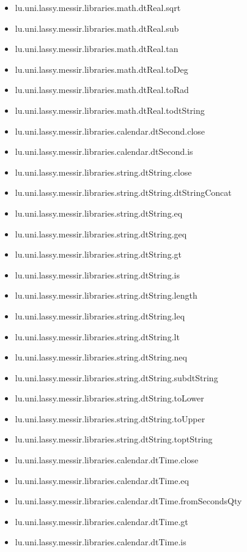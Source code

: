 \begin{itemize}
\item lu.uni.lassy.messir.libraries.math.dtReal.sqrt 
\item lu.uni.lassy.messir.libraries.math.dtReal.sub 
\item lu.uni.lassy.messir.libraries.math.dtReal.tan 
\item lu.uni.lassy.messir.libraries.math.dtReal.toDeg 
\item lu.uni.lassy.messir.libraries.math.dtReal.toRad 
\item lu.uni.lassy.messir.libraries.math.dtReal.todtString 
\item lu.uni.lassy.messir.libraries.calendar.dtSecond.close 
\item lu.uni.lassy.messir.libraries.calendar.dtSecond.is 
\item lu.uni.lassy.messir.libraries.string.dtString.close 
\item lu.uni.lassy.messir.libraries.string.dtString.dtStringConcat 
\item lu.uni.lassy.messir.libraries.string.dtString.eq 
\item lu.uni.lassy.messir.libraries.string.dtString.geq 
\item lu.uni.lassy.messir.libraries.string.dtString.gt 
\item lu.uni.lassy.messir.libraries.string.dtString.is 
\item lu.uni.lassy.messir.libraries.string.dtString.length 
\item lu.uni.lassy.messir.libraries.string.dtString.leq 
\item lu.uni.lassy.messir.libraries.string.dtString.lt 
\item lu.uni.lassy.messir.libraries.string.dtString.neq 
\item lu.uni.lassy.messir.libraries.string.dtString.subdtString 
\item lu.uni.lassy.messir.libraries.string.dtString.toLower 
\item lu.uni.lassy.messir.libraries.string.dtString.toUpper 
\item lu.uni.lassy.messir.libraries.string.dtString.toptString 
\item lu.uni.lassy.messir.libraries.calendar.dtTime.close 
\item lu.uni.lassy.messir.libraries.calendar.dtTime.eq 
\item lu.uni.lassy.messir.libraries.calendar.dtTime.fromSecondsQty 
\item lu.uni.lassy.messir.libraries.calendar.dtTime.gt 
\item lu.uni.lassy.messir.libraries.calendar.dtTime.is 

\end{itemize}
